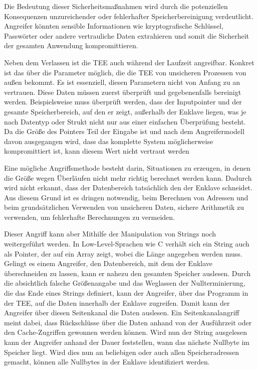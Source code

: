 Die Bedeutung dieser Sicherheitsmaßnahmen wird durch die potenziellen Konsequenzen unzureichender oder fehlerhafter Speicherbereinigung verdeutlicht. Angreifer könnten sensible Informationen wie kryptografische Schlüssel, Passwörter oder andere vertrauliche Daten extrahieren und somit die Sicherheit der gesamten Anwendung kompromittieren.

Neben dem Verlassen ist die TEE auch während der Laufzeit angreifbar. Konkret ist das über die Parameter möglich, die die TEE von unsicheren Prozessen von außen bekommt. Es ist essenziell, diesen Parametern nicht von Anfang zu an vertrauen. Diese Daten müssen zuerst überprüft und gegebenenfalls bereinigt werden.  Beispielsweise muss überprüft werden, dass der Inputpointer und der gesamte Speicherbereich, auf den er zeigt, außerhalb der Enklave liegen, was je nach Datentyp oder Strukt nicht nur aus einer einfachen Überprüfung besteht. Da die Größe des Pointers Teil der Eingabe ist und nach dem Angreifermodell davon ausgegangen wird, dass das komplette System möglicherweise kompromittiert ist, kann diesem Wert nicht vertraut werden

Eine mögliche Angriffsmethode besteht darin, Situationen zu erzeugen, in denen die Größe wegen Überläufen nicht mehr richtig berechnet werden kann. Dadurch wird nicht erkannt, dass der Datenbereich tatsächlich den der Enklave schneidet. Aus diesem Grund ist es dringen notwendig, beim Berechnen von Adressen und beim grundsätzlichen Verwenden von unsicheren Daten, sichere Arithmetik zu verwenden, um fehlerhafte Berechnungen zu vermeiden.

Dieser Angriff kann aber Mithilfe der Manipulation von Strings noch weitergeführt werden. In Low-Level-Sprachen wie C verhält sich ein String auch als Pointer, der auf ein Array zeigt, wobei die Länge angegeben werden muss. 
Gelingt es einem Angreifer, den Datenbereich, mit dem der Enklave überschneiden zu lassen, kann er nahezu den gesamten Speicher auslesen. Durch die absichtlich falsche Größenangabe und das Weglassen der Nullterminierung, die das Ende eines Strings definiert, kann der Angreifer, über das Programm in der TEE, auf die Daten innerhalb der Enklave zugreifen. 
Damit kann der Angreifer über diesen Seitenkanal die Daten auslesen. 
Ein Seitenkanalangriff meint dabei, dass Rückschlüsse über die Daten anhand von der Ausführzeit oder den Cache-Zugriffen gewonnen werden können. Wird nun der String ausgelesen kann der Angreifer anhand der Dauer feststellen, wann das nächste Nullbyte im Speicher liegt. 
Wird dies nun an beliebigen oder auch allen Speicheradressen gemacht, können alle Nullbytes in der Enklave identifiziert werden\cite{TEEPaper}.

